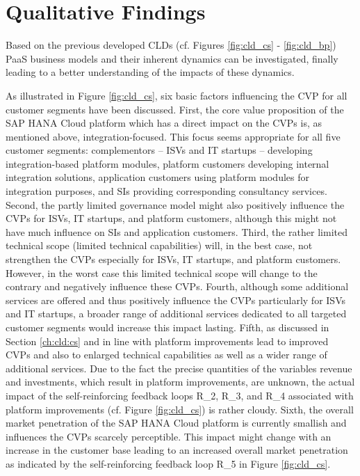 \section{Qualitative Findings}\label{ch:poc:qf}

Based on the previous developed \acp{CLD} (cf. Figures \ref{fig:cld_cs} - \ref{fig:cld_bp}) \ac{PaaS} business models and their inherent dynamics can be investigated, finally leading to a better understanding of the impacts of these dynamics.

As illustrated in Figure \ref{fig:cld_cs}, six basic factors influencing the \ac{CVP} for all customer segments have been discussed. First, the core value proposition of the SAP HANA Cloud platform which has a direct impact on the \acp{CVP} is, as mentioned above, integration-focused. This focus seems appropriate for all five customer segments: complementors -- \acp{ISV} and \ac{IT} startups -- developing integration-based platform modules, platform customers developing internal integration solutions, application customers using platform modules for integration purposes, and \acp{SI} providing corresponding consultancy services. Second, the partly limited governance model might also positively influence the \acp{CVP} for \acp{ISV}, \ac{IT} startups, and platform customers, although this might not have much influence on \acp{SI} and application customers. Third, the rather limited technical scope (limited technical capabilities) will, in the best case, not strengthen the \acp{CVP} especially for \acp{ISV}, \ac{IT} startups, and platform customers. However, in the worst case this limited technical scope will change to the contrary and negatively influence these \acp{CVP}. Fourth, although some additional services are offered and thus positively influence the \acp{CVP} particularly for \acp{ISV} and \ac{IT} startups, a broader range of additional services dedicated to all targeted customer segments would increase this impact lasting. Fifth, as discussed in Section \ref {ch:cld:cs} and in line with \citet[p. 200]{Evans2003} platform improvements lead to improved \acp{CVP} and also to enlarged technical capabilities as well as a wider range of additional services. Due to the fact the precise quantities of the variables revenue and investments, which result in platform improvements, are unknown, the actual impact of the self-reinforcing feedback loops R\_2, R\_3, and R\_4 associated with platform improvements (cf. Figure \ref{fig:cld_cs}) is rather cloudy. Sixth, the overall market penetration of the SAP HANA Cloud platform is currently smallish and influences the \acp{CVP} scarcely perceptible. This impact might change with an increase in the customer base leading to an increased overall market penetration as indicated by the self-reinforcing feedback loop R\_5 in Figure \ref{fig:cld_cs}.


